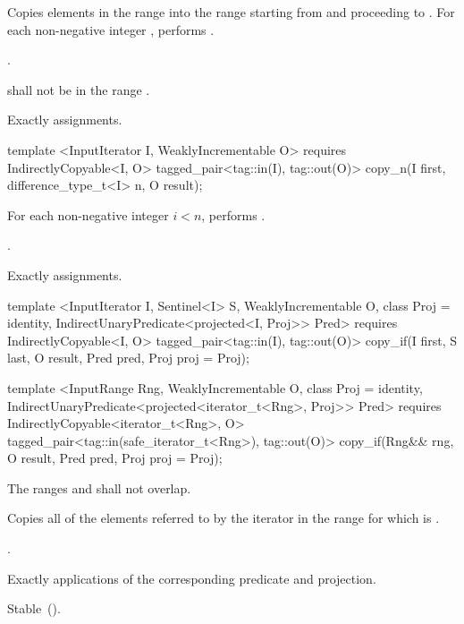 \begin{itemdescr}
\pnum
\effects Copies elements in the range  into the range
 starting from  and
proceeding to . For each non-negative integer
, performs .

\pnum
\returns {}.

\pnum
\requires {} shall not be in the range .

\pnum
\complexity Exactly  assignments.
\end{itemdescr}

%
\begin{itemdecl}
template <InputIterator I, WeaklyIncrementable O>
  requires IndirectlyCopyable<I, O>
  tagged_pair<tag::in(I), tag::out(O)>
    copy_n(I first, difference_type_t<I> n, O result);
\end{itemdecl}

\begin{itemdescr}
\pnum
\effects For each non-negative integer
$i < n$, performs .

\pnum
\returns {}.

\pnum
\complexity Exactly  assignments.
\end{itemdescr}

%
\begin{itemdecl}
template <InputIterator I, Sentinel<I> S, WeaklyIncrementable O, class Proj = identity,
    IndirectUnaryPredicate<projected<I, Proj>> Pred>
  requires IndirectlyCopyable<I, O>
  tagged_pair<tag::in(I), tag::out(O)>
    copy_if(I first, S last, O result, Pred pred, Proj proj = Proj{});

template <InputRange Rng, WeaklyIncrementable O, class Proj = identity,
    IndirectUnaryPredicate<projected<iterator_t<Rng>, Proj>> Pred>
  requires IndirectlyCopyable<iterator_t<Rng>, O>
  tagged_pair<tag::in(safe_iterator_t<Rng>), tag::out(O)>
    copy_if(Rng&& rng, O result, Pred pred, Proj proj = Proj{});
\end{itemdecl}

\begin{itemdescr}
\pnum
\requires The ranges  and  shall not overlap.

\pnum
\effects Copies all of the elements referred to by the iterator  in the range 
for which  is .

\pnum
\returns {}.

\pnum
\complexity Exactly  applications of the corresponding predicate and projection.

\pnum
\remarks Stable~().
\end{itemdescr}


